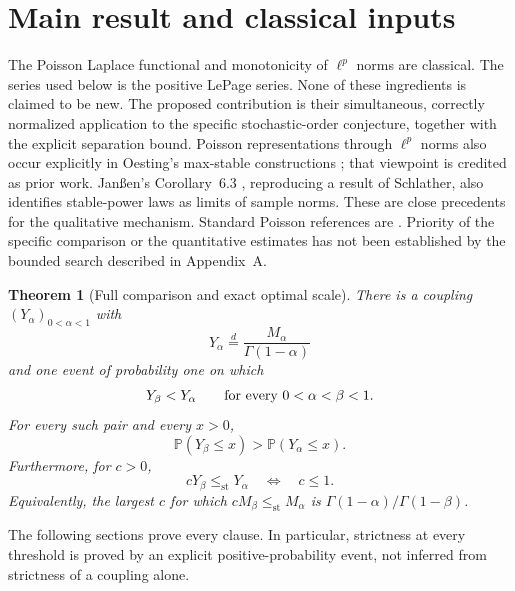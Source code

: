 \documentclass[11pt,a4paper]{article}
\newtheorem{theorem}{Theorem}[section]
\begin{document}
\section{Main result and classical inputs}
The Poisson Laplace functional and monotonicity of $\ell^p$ norms are
classical. The series used below is the positive LePage series. None of
these ingredients is claimed to be new. The proposed contribution is
their simultaneous, correctly normalized application to the specific
stochastic-order conjecture, together with the explicit separation bound.
Poisson representations through \(\ell^p\) norms also occur explicitly in
Oesting's max-stable constructions \cite{Oesting}; that viewpoint is credited
as prior work. Jan\ss en's Corollary~6.3 \cite{Janssen}, reproducing
a result of Schlather, also identifies stable-power laws as limits of
sample norms. These are close precedents for the qualitative mechanism.
Standard Poisson references are \cite{LWZ,LP}. Priority of the
specific comparison or the quantitative estimates has not been established
by the bounded search described in Appendix~A.

\begin{theorem}[Full comparison and exact optimal scale]\label{thm:main}
There is a coupling \((Y_\alpha)_{0<\alpha<1}\) with
\[
Y_\alpha\stackrel d=\frac{M_\alpha}{\Gamma(1-\alpha)}
\]
and one event of probability one on which
\[
Y_\beta<Y_\alpha\qquad\hbox{for every }0<\alpha<\beta<1.
\]
For every such pair and every \(x>0\),
\[
\mathbb P(Y_\beta\leq x)>\mathbb P(Y_\alpha\leq x).
\]
Furthermore, for \(c>0\),
\[
cY_\beta\leq_{\mathrm{st}}Y_\alpha\quad\Longleftrightarrow\quad c\leq1.
\]
Equivalently, the largest \(c\) for which
\(cM_\beta\leq_{\mathrm{st}}M_\alpha\) is
\(\Gamma(1-\alpha)/\Gamma(1-\beta)\).
\end{theorem}
The following sections prove every clause. In particular, strictness
at every threshold is proved by an explicit positive-probability
event, not inferred from strictness of a coupling alone.
\end{document}

